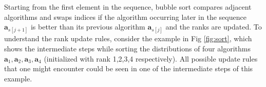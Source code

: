 \documentclass[conference]{IEEEtran}
\begin{document}
 Starting from the first element in the sequence,  bubble sort\cite{bubblesort} compares adjacent algorithms and swaps indices if the algorithm occurring later in the sequence $\mathbf{a}_{s[j+1]}$ is better than its previous algorithm $\mathbf{a}_{s[j]}$ and the ranks are updated. To understand the rank update rules, consider the example in Fig \ref{fig:sort}, which shows the intermediate steps while sorting the distributions of four algorithms $\mathbf{a}_1, \mathbf{a}_2, \mathbf{a}_3,\mathbf{a}_4$ (initialized with rank 1,2,3,4 respectively). All possible update rules that one might encounter could be seen in one of the intermediate steps of this example.
\end{document}
